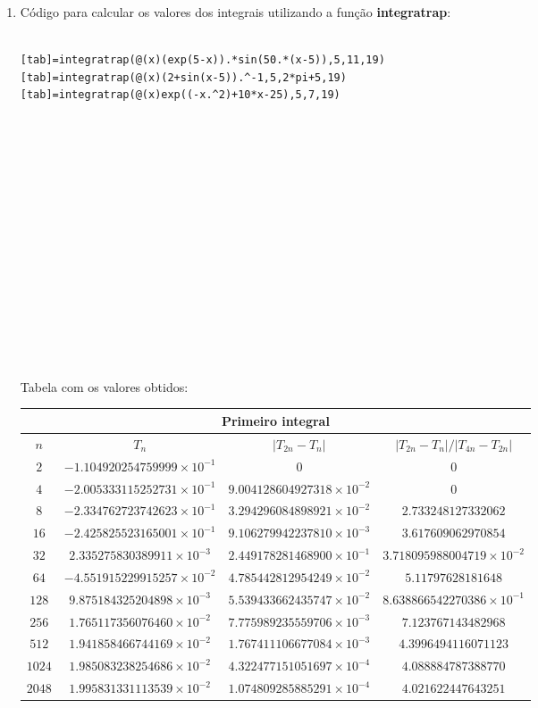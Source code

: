 \documentclass[a4paper,10pt]{extarticle}
\begin{document}
\begin{enumerate}
\begin{enumerate}
\item Código para calcular os valores dos integrais utilizando a função {\bf integratrap}:
{\small
\begin{verbatim}

[tab]=integratrap(@(x)(exp(5-x)).*sin(50.*(x-5)),5,11,19)
[tab]=integratrap(@(x)(2+sin(x-5)).^-1,5,2*pi+5,19)
[tab]=integratrap(@(x)exp((-x.^2)+10*x-25),5,7,19)
















\end{verbatim}
}
Tabela com os valores obtidos:
\begin{center}
{\small\begin{tabular}{|c|c|c|c|}
\hline
\multicolumn{4}{|c|}{Primeiro integral}\\
\hline
 $n$&$T_n$&$|T_{2n}-T_n|$&$|T_{2n}-T_n|/|T_{4n}-T_{2n}|$\\
\hline
 $2$&$-1.104920254759999\times 10^{-1}$&$0$&$0$\\
\hline
 $4$&$-2.005333115252731\times 10^{-1}$&$9.004128604927318\times 10^{-2}$&$0$\\
\hline
 $8$&$-2.334762723742623\times 10^{-1}$&$3.294296084898921\times 10^{-2}$&$2.733248127332062$\\
\hline
$16$&$-2.425825523165001\times 10^{-1}$&$9.106279942237810\times 10^{-3}$&$3.617609062970854 $\\
\hline
$32$&$2.335275830389911\times 10^{-3}$&$2.449178281468900\times 10^{-1}$&$3.718095988004719\times 10^{-2}$\\
\hline
$64$&$-4.551915229915257\times 10^{-2}$&$4.785442812954249\times 10^{-2}$&$5.11797628181648$\\
\hline
$128$&$9.875184325204898\times 10^{-3}$&$5.539433662435747\times 10^{-2}$&$8.638866542270386\times 10^{-1}$\\
\hline
$256$&$1.765117356076460\times 10^{-2}$&$7.775989235559706\times 10^{-3}$&$7.123767143482968$\\
\hline
$512$&$1.941858466744169\times 10^{-2}$&$1.767411106677084\times 10^{-3}$&$4.3996494116071123$\\
\hline
$1024$&$1.985083238254686\times 10^{-2}$&$4.322477151051697\times 10^{-4}$&$4.088884787388770$\\
\hline
$2048$&$1.995831331113539\times 10^{-2}$&$1.074809285885291\times 10^{-4}$&$4.021622447643251$\\

\end{tabular}}
\end{center}
\end{enumerate}
\end{enumerate}
\end{document}
